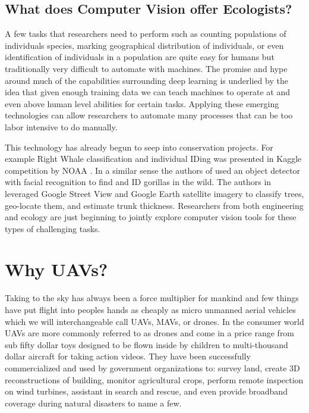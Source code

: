 \subsection{What does Computer Vision offer Ecologists?}

A few tasks that researchers need to perform such as counting populations of individuals species, marking geographical distribution of individuals, or even identification of individuals in a population are quite easy for humans but traditionally very difficult to automate with machines. The promise and hype around much of the capabilities surrounding deep learning is underlied by the idea that given enough training data we can teach machines to operate at and even above human level abilities for certain tasks. Applying these emerging technologies can allow researchers to automate many processes that can be too labor intensive to do manually.

This technology has already begun to seep into conservation projects. For example Right Whale classification and individual IDing was presented in Kaggle competition by NOAA \cite{DeepSense}. In a similar sense the authors of \cite{Gorilla} used an object detector with facial recognition to find and ID gorillas in the wild. The authors in \cite{GoogleTrees} leveraged Google Street View and Google Earth satellite imagery to classify trees, geo-locate them, and estimate trunk thickness. Researchers from both engineering and ecology are just beginning to jointly explore computer vision tools for these types of challenging tasks.


\section{Why UAVs?}

Taking to the sky has always been a force multiplier for mankind and few things have put flight into peoples hands as cheaply as micro unmanned aerial vehicles which we will interchangeable call UAVs, MAVs, or drones. In the consumer world UAVs are more commonly referred to as drones and come in a price range from sub fifty dollar toys designed to be flown inside by children to multi-thousand dollar aircraft for taking action videos. They have been successfully commercialized and used by government organizations to: survey land, create 3D reconstructions of building, monitor agricultural crops, perform remote inspection on wind turbines, assistant in search and rescue, and even provide broadband coverage during natural disasters to name a few.

